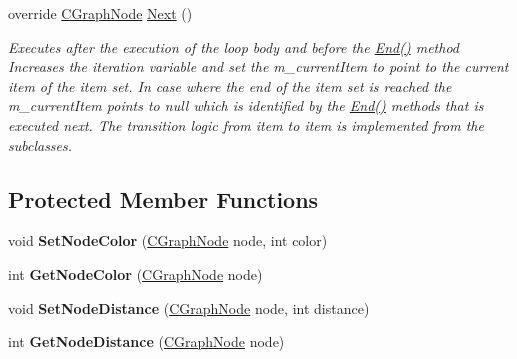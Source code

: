 \begin{DoxyCompactItemize}
override \hyperlink{class_graph_library_1_1_c_graph_node}{C\+Graph\+Node} \hyperlink{class_graph_library_1_1_c_it___graph_b_f_s_ab836a3c5caca3c8d63d56827b677a243}{Next} ()
\begin{DoxyCompactList}\small\item\em Executes after the execution of the loop body and before the \hyperlink{class_graph_library_1_1_c_it___graph_b_f_s_a46418dc24ecf2e8ad3aa3541a70d06b2}{End()} method Increases the iteration variable and set the m\+\_\+current\+Item to point to the current item of the item set. In case where the end of the item set is reached the m\+\_\+current\+Item points to null which is identified by the \hyperlink{class_graph_library_1_1_c_it___graph_b_f_s_a46418dc24ecf2e8ad3aa3541a70d06b2}{End()} methods that is executed next. The transition logic from item to item is implemented from the subclasses. \end{DoxyCompactList}\end{DoxyCompactItemize}
\subsection*{Protected Member Functions}
\begin{DoxyCompactItemize}
\item 
\hypertarget{class_graph_library_1_1_c_it___graph_b_f_s_a23f45ca6cd30441e3204f269a01f6c66}{}void {\bfseries Set\+Node\+Color} (\hyperlink{class_graph_library_1_1_c_graph_node}{C\+Graph\+Node} node, int color)\label{class_graph_library_1_1_c_it___graph_b_f_s_a23f45ca6cd30441e3204f269a01f6c66}

\item 
\hypertarget{class_graph_library_1_1_c_it___graph_b_f_s_a1c08c6b1ae81ac9599844f7269de5a38}{}int {\bfseries Get\+Node\+Color} (\hyperlink{class_graph_library_1_1_c_graph_node}{C\+Graph\+Node} node)\label{class_graph_library_1_1_c_it___graph_b_f_s_a1c08c6b1ae81ac9599844f7269de5a38}

\item 
\hypertarget{class_graph_library_1_1_c_it___graph_b_f_s_ae3bf125e1855a8a4dbf751bce31fd138}{}void {\bfseries Set\+Node\+Distance} (\hyperlink{class_graph_library_1_1_c_graph_node}{C\+Graph\+Node} node, int distance)\label{class_graph_library_1_1_c_it___graph_b_f_s_ae3bf125e1855a8a4dbf751bce31fd138}

\item 
\hypertarget{class_graph_library_1_1_c_it___graph_b_f_s_a13899ef9bfec0a8da8248b06946d0f8f}{}int {\bfseries Get\+Node\+Distance} (\hyperlink{class_graph_library_1_1_c_graph_node}{C\+Graph\+Node} node)\label{class_graph_library_1_1_c_it___graph_b_f_s_a13899ef9bfec0a8da8248b06946d0f8f}

\end{DoxyCompactItemize}
